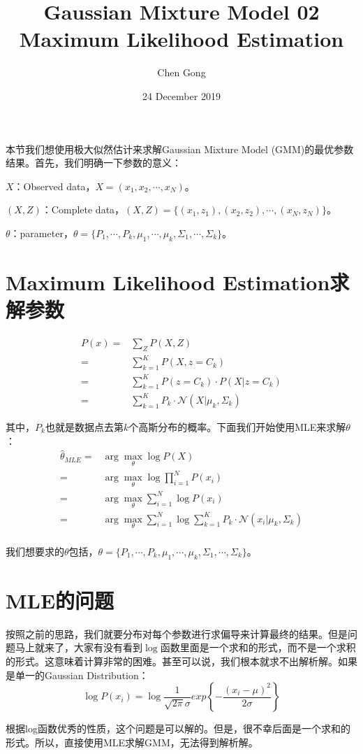 \documentclass[a4paper]{article}
\title{Gaussian Mixture Model 02 Maximum Likelihood Estimation}
\author{Chen Gong}
\date{24 December 2019}
\begin{document}
\maketitle
本节我们想使用极大似然估计来求解Gaussian Mixture Model (GMM)的最优参数结果。首先，我们明确一下参数的意义：

$X$：Observed data，$X = (x_1, x_2, \cdots, x_N)$。

$(X,Z)$：Complete data，$(X,Z) = \{ (x_1,z_1),(x_2,z_2),\cdots,(x_N,z_N) \}$。

$\theta$：parameter，$\theta=\{ P_1, \cdots, P_k, \mu_1, \cdots, \mu_k,\Sigma_1,\cdots,\Sigma_k \}$。

\section{Maximum Likelihood Estimation求解参数}
\begin{equation}
    \begin{split}
        P(x) 
        = & \sum_Z P(X,Z) \\
        = & \sum_{k=1}^K P(X,z = C_k) \\
        = & \sum_{k=1}^K P(z = C_k)\cdot P(X|z=C_k) \\
        = & \sum_{k=1}^K P_k \cdot \mathcal{N}(X|\mu_k,\Sigma_k)
    \end{split}
\end{equation}

其中，$P_k$也就是数据点去第$k$个高斯分布的概率。下面我们开始使用MLE来求解$\theta$：
\begin{equation}
    \begin{split}
        \hat{\theta}_{MLE} 
        = & \arg\max_{\theta} \log P(X) \\
        = & \arg\max_{\theta} \log \prod_{i=1}^N P(x_i) \\
        = & \arg\max_{\theta}  \sum_{i=1}^N  \log P(x_i) \\
        = & \arg\max_{\theta}  \sum_{i=1}^N  \log \sum_{k=1}^K P_k \cdot \mathcal{N}(x_i|\mu_k,\Sigma_k) \\
    \end{split}
\end{equation}

我们想要求的$\theta$包括，$\theta=\{ P_1, \cdots, P_k, \mu_1, \cdots, \mu_k,\Sigma_1,\cdots,\Sigma_k \}$。

\section{MLE的问题}
按照之前的思路，我们就要分布对每个参数进行求偏导来计算最终的结果。但是问题马上就来了，大家有没有看到$\log$函数里面是一个求和的形式，而不是一个求积的形式。这意味着计算非常的困难。甚至可以说，我们根本就求不出解析解。如果是单一的Gaussian Distribution：
\begin{equation}
    \log P(x_i) = \log \frac{1}{\sqrt{2 \pi} \sigma} exp\left\{ -\frac{(x_i - \mu)^2}{2\sigma} \right\}
\end{equation}

根据log函数优秀的性质，这个问题是可以解的。但是，很不幸后面是一个求和的形式。所以，直接使用MLE求解GMM，无法得到解析解。
\end{document}
